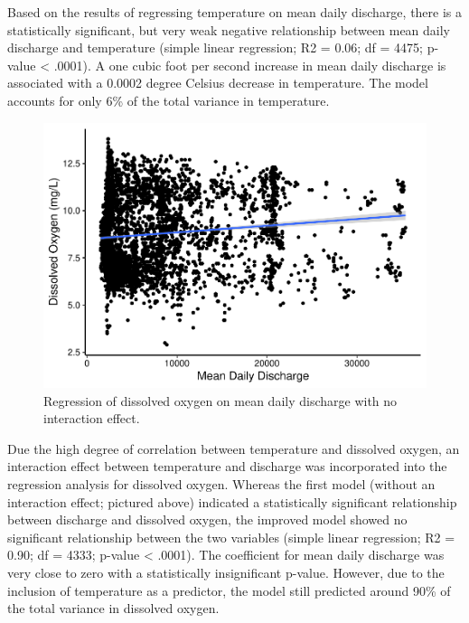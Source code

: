 \documentclass[12pt,]{article}
\begin{document}
Based on the results of regressing temperature on mean daily discharge,
there is a statistically significant, but very weak negative
relationship between mean daily discharge and temperature (simple linear
regression; R2 = 0.06; df = 4475; p-value \textless{} .0001). A one
cubic foot per second increase in mean daily discharge is associated
with a 0.0002 degree Celsius decrease in temperature. The model accounts
for only 6\% of the total variance in temperature.

\newpage

\begin{figure}
\centering
\includegraphics{Project_Template_files/figure-latex/unnamed-chunk-14-1.pdf}
\caption{Regression of dissolved oxygen on mean daily discharge with no
interaction effect.}
\end{figure}

Due the high degree of correlation between temperature and dissolved
oxygen, an interaction effect between temperature and discharge was
incorporated into the regression analysis for dissolved oxygen. Whereas
the first model (without an interaction effect; pictured above)
indicated a statistically significant relationship between discharge and
dissolved oxygen, the improved model showed no significant relationship
between the two variables (simple linear regression; R2 = 0.90; df =
4333; p-value \textless{} .0001). The coefficient for mean daily
discharge was very close to zero with a statistically insignificant
p-value. However, due to the inclusion of temperature as a predictor,
the model still predicted around 90\% of the total variance in dissolved
oxygen.

\newpage
\end{document}

